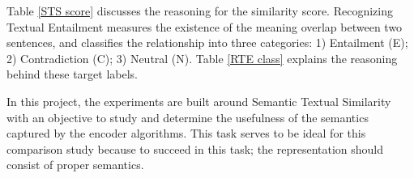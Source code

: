 \documentclass[12pt]{report} %
\begin{document}
    Table \ref{STS score} discusses the reasoning for the similarity score. Recognizing Textual Entailment measures the existence of the meaning overlap between two sentences, and classifies the relationship into three categories: 1) Entailment (E); 2) Contradiction (C); 3) Neutral (N). Table \ref{RTE class} explains the reasoning behind these target labels. 
    
    In this project, the experiments are built around Semantic Textual Similarity with an objective to study and determine the usefulness of the semantics captured by the encoder algorithms. This task serves to be ideal for this comparison study because to succeed in this task; the representation should consist of proper semantics. 
    
    \begin{table}[ht] 
    	\centering
    	\caption{Recognizing Textual Entailment (Classification Label) \citep{jurafsky2014speech}}
    	\label{RTE class} 
    \end{table}    
    
\end{document}
